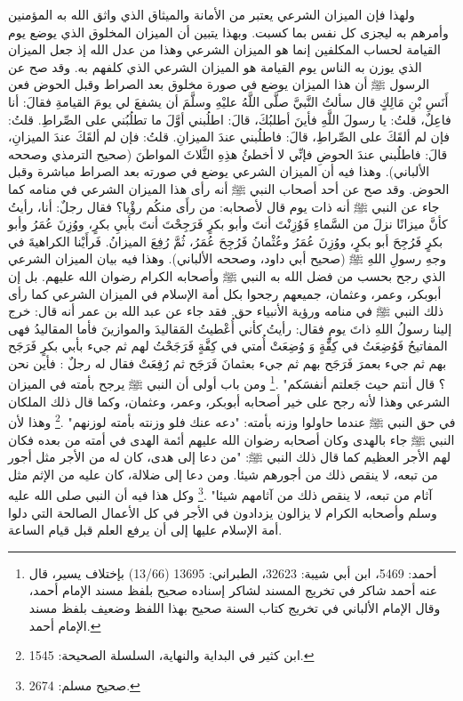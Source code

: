 ولهذا فإن الميزان الشرعي يعتبر من الأمانة والميثاق الذي واثق الله به المؤمنين وأمرهم به ليجزى كل نفس بما كسبت. وبهذا يتبين أن الميزان المخلوق الذي يوضع يوم القيامة لحساب المكلفين إنما هو الميزان الشرعي وهذا من عدل الله إذ جعل الميزان الذي يوزن به الناس يوم القيامة هو الميزان الشرعي الذي كلفهم به. وقد صح عن الرسول ﷺ أن هذا الميزان يوضع في صورة مخلوق بعد الصراط وقبل الحوض فعن أَنَسِ بْنِ مَالِكٍ قال سألتُ النَّبيَّ صلَّى اللَّهُ عليْهِ وسلَّمَ أن يشفعَ لي يومَ القيامةِ فقالَ: أنا فاعِلٌ، قلتُ: يا رسولَ اللَّهِ فأينَ أطلبُكَ، قالَ: اطلُبني أوَّلَ ما تطلُبُني على الصِّراطِ. قلتُ: فإن لم ألقَكَ على الصِّراطِ، قالَ: فاطلُبني عندَ الميزانِ. قلتُ: فإن لم ألقَكَ عندَ الميزانِ، قالَ: فاطلُبني عندَ الحوضِ فإنِّي لا أخطئُ هذِهِ الثَّلاثَ المواطنَ {\footnotesize (صحيح الترمذي وصححه الألباني)}. وهذا فيه أن الميزان الشرعي يوضع في صورته بعد الصراط مباشرة وقبل الحوض. وقد صح عن أحد أصحاب النبي ﷺ أنه رأى هذا الميزان الشرعي في منامه كما جاء عن النبي ﷺ أنه ذات يوم قال لأصحابه: من رأَى منكُم رؤْيا؟ فقال رجلٌ: أنا، رأيتُ كأنَّ ميزانًا نزلَ من السَّماءِ فَوُزِنْتَ أنتَ وأبو بكرٍ فَرَجِحْتَ أنتَ بأبيِ بكرٍ، ووُزِنَ عُمَرُ وأبو بكرٍ فَرُجِحَ أبو بكرٍ، ووُزِنَ عُمَرُ وعُثْمانُ فَرُجِحَ عُمَرُ، ثُمَّ رُفِعَ الميزانُ. فَرأَيْنا الكراهيةَ في وجهِ رسولِ اللهِ ﷺ {\footnotesize (صحيح أبي داود، وصححه الألباني)}. وهذا فيه بيان الميزان الشرعي الذي رجح بحسب من فضل الله به النبي ﷺ وأصحابه الكرام رضوان الله عليهم. بل إن أبوبكر، وعمر، وعثمان، جميعهم رجحوا بكل أمة الإسلام في الميزان الشرعي كما رأى ذلك النبي ﷺ في منامه ورؤية الأنبياء حق. فقد جاء عن عبد الله بن عمر أنه قال: خرج إلينا رسولُ اللهِ ذاتَ يومٍ فقال: رأيتُ كأني أُعْطيتُ المَقاليدَ والموازينَ فأما المقاليدُ فهى المفاتيحُ فَوُضِعَتُ في كِفَّةٍ وَ وُضِعَتْ أُمتي في كِفَّةٍ فَرَجَحْتُ لهم ثم جيء بأبي بكرٍ فَرَجَح بهم ثم جيء بعمرَ فَرَجَح بهم ثم جيء بعثمانَ فَرَجَح ثم رُفِعَتْ فقال له رجلٌ : فأين نحن ؟ قال أنتم حيث جَعلتم أنفسَكم" \href{https://shamela.ws/book/12051/671#p2}{\faExternalLink} \href{https://shamela.ws/book/25794/4217#p1}{\faExternalLink} \cite{albani_Sahiha}.\footnote{أحمد: 5469، ابن أبي شيبة: 32623، الطبراني: 13695 (13/66) بإختلاف يسير، قال عنه أحمد شاكر في تخريج المسند لشاكر إسناده صحيح بلفظ مسند الإمام أحمد، وقال الإمام الألباني في تخريج كتاب السنة صحيح بهذا اللفظ وضعيف بلفظ مسند الإمام أحمد.} ومن باب أولى أن النبي ﷺ يرجح بأمته في الميزان الشرعي وهذا لأنه رجح على خير أصحابه أبوبكر، وعمر، وعثمان، وكما قال ذلك الملكان في حق النبي ﷺ عندما حاولوا وزنه بأمته: "دعه عنك فلو وزنته بأمته لوزنهم"  \href{https://shamela.ws/book/9442/2253#p18}{\faExternalLink} \cite{albani_Sahiha}.\footnote{ابن كثير في البداية والنهاية، السلسلة الصحيحة: 1545.} وهذا لأن النبي ﷺ جاء بالهدى وكان أصحابه رضوان الله عليهم أئمة الهدى في أمته من بعده فكان لهم الأجر العظيم كما قال ذلك النبي ﷺ: "من دعا إلى هدى، كان له من الأجر مثل أجور من تبعه، لا ينقص ذلك من أجورهم شيئا. ومن دعا إلى ضلالة، كان عليه من الإثم مثل آثام من تبعه، لا ينقص ذلك من آثامهم شيئا" \href{https://shamela.ws/book/1727/6739#p2}{\faExternalLink} \cite{bukhari}.\footnote{صحيح مسلم: 2674.} وكل هذا فيه أن النبي صلى الله عليه وسلم وأصحابه الكرام لا يزالون يزدادون في الأجر في كل الأعمال الصالحة التي دلوا أمة الإسلام عليها إلى أن يرفع العلم قبل قيام الساعة. 

